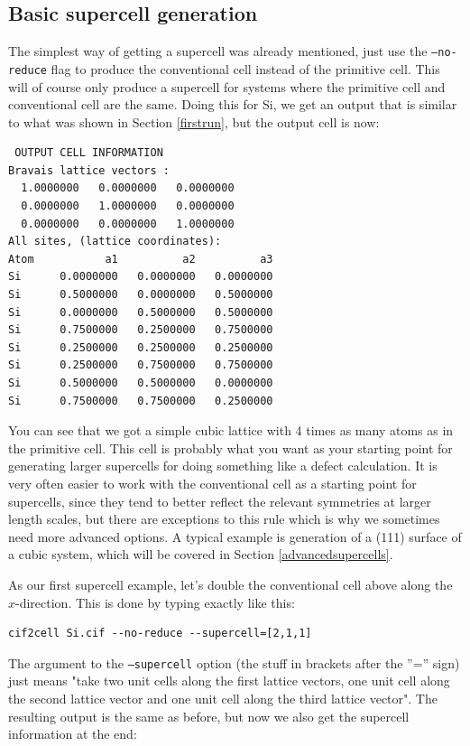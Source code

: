 \documentclass[11pt]{article}
\begin{document}
\subsection{Basic supercell generation}\label{basicsupercells}
The simplest way of getting a supercell was already mentioned, just use the \texttt{--no-reduce} flag to produce the conventional cell instead of the primitive cell. This will of course only produce a supercell for systems where the primitive cell and conventional cell are the same. Doing this for Si, we get an output that is similar to what was shown in Section \ref{firstrun}, but the output cell is now:
\begin{verbatim}
 OUTPUT CELL INFORMATION
Bravais lattice vectors :
  1.0000000   0.0000000   0.0000000 
  0.0000000   1.0000000   0.0000000 
  0.0000000   0.0000000   1.0000000 
All sites, (lattice coordinates):
Atom           a1          a2          a3 
Si      0.0000000   0.0000000   0.0000000
Si      0.5000000   0.0000000   0.5000000
Si      0.0000000   0.5000000   0.5000000
Si      0.7500000   0.2500000   0.7500000
Si      0.2500000   0.2500000   0.2500000
Si      0.2500000   0.7500000   0.7500000
Si      0.5000000   0.5000000   0.0000000
Si      0.7500000   0.7500000   0.2500000
\end{verbatim}
You can see that we got a simple cubic lattice with 4 times as many atoms as in the primitive cell. This cell is probably what you want as your starting point for generating larger supercells for doing something like a defect calculation. It is very often easier to work with the conventional cell as a starting point for supercells, since they tend to better reflect the relevant symmetries at larger length scales, but there are exceptions to this rule which is why we sometimes need more advanced options. A typical example is generation of a (111) surface of a cubic system, which will be covered in Section \ref{advancedsupercells}.

As our first supercell example, let's double the conventional cell above along the $x$-direction. This is done by typing exactly like this:
\begin{verbatim}
cif2cell Si.cif --no-reduce --supercell=[2,1,1]
\end{verbatim}
The argument to the \texttt{--supercell} option (the stuff in brackets after the ''='' sign)  just means "take two unit cells along the first lattice vectors, one unit cell along the second lattice vector and one unit cell along the third lattice vector". The resulting output is the same as before, but now we also get the supercell information at the end:
\end{document}
